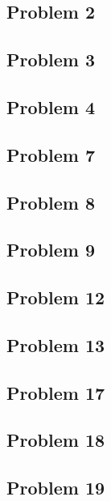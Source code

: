 \documentclass[11pt]{article}
\begin{document}
\subsection*{Problem 2}

\subsection*{Problem 3}

\subsection*{Problem 4}

\subsection*{Problem 7}

\subsection*{Problem 8}

\subsection*{Problem 9}

\subsection*{Problem 12}

\subsection*{Problem 13}

\subsection*{Problem 17}

\subsection*{Problem 18}

\subsection*{Problem 19}
\end{document}
